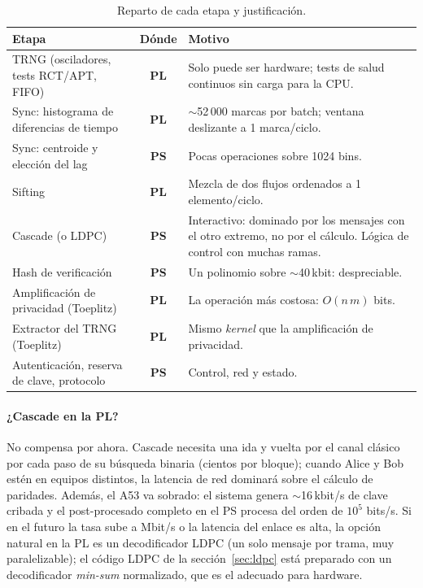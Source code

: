 \documentclass[a4paper,11pt]{article}
\newcommand{\PS}{\textcolor{ps}{\textbf{PS}}}
\newcommand{\PL}{\textcolor{pl}{\textbf{PL}}}
\begin{document}
\begin{table}[htbp]
\centering
\caption{Reparto de cada etapa y justificación.}
\small
\begin{tabularx}{\textwidth}{l c X}
\toprule
Etapa & Dónde & Motivo \\
\midrule
TRNG (osciladores, tests RCT/APT, FIFO) & \PL & Solo puede ser hardware; tests de salud continuos sin carga para la CPU. \\
Sync: histograma de diferencias de tiempo & \PL & $\sim$52\,000 marcas por batch; ventana deslizante a 1 marca/ciclo. \\
Sync: centroide y elección del lag & \PS & Pocas operaciones sobre 1024 bins. \\
Sifting & \PL & Mezcla de dos flujos ordenados a 1 elemento/ciclo. \\
Cascade (o LDPC) & \PS & Interactivo: dominado por los mensajes con el otro extremo, no por el cálculo. Lógica de control con muchas ramas. \\
Hash de verificación & \PS & Un polinomio sobre $\sim$40\,kbit: despreciable. \\
Amplificación de privacidad (Toeplitz) & \PL & La operación más costosa: $O(n\,m)$ bits. \\
Extractor del TRNG (Toeplitz) & \PL & Mismo \emph{kernel} que la amplificación de privacidad. \\
Autenticación, reserva de clave, protocolo & \PS & Control, red y estado. \\
\bottomrule
\end{tabularx}
\end{table}

\paragraph{¿Cascade en la PL?} No compensa por ahora. Cascade necesita una ida y vuelta por el
canal clásico por cada paso de su búsqueda binaria (cientos por bloque); cuando Alice y Bob estén
en equipos distintos, la latencia de red dominará sobre el cálculo de paridades. Además, el A53 va
sobrado: el sistema genera $\sim$16\,kbit/s de clave cribada y el post-procesado completo en el PS
procesa del orden de $10^5$ bits/s. Si en el futuro la tasa sube a Mbit/s o la latencia del enlace
es alta, la opción natural en la PL es un decodificador LDPC (un solo mensaje por trama, muy
paralelizable); el código LDPC de la sección~\ref{sec:ldpc} está preparado con un decodificador
\emph{min-sum} normalizado, que es el adecuado para hardware.
\end{document}
